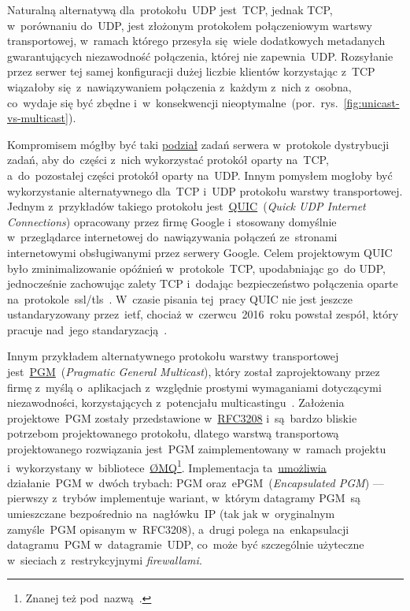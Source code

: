 \documentclass[thesis]{subfiles}
\begin{document}
Naturalną alternatywą dla~protokołu~UDP jest~TCP, jednak TCP, w~porównaniu do~UDP, jest złożonym protokołem połączeniowym wartswy transportowej, w~ramach którego przesyła się~wiele dodatkowych metadanych gwarantujących niezawodność połączenia, której nie zapewnia~UDP. Rozsyłanie przez serwer tej samej konfiguracji dużej liczbie klientów korzystając z~TCP wiązałoby się~z~nawiązywaniem połączenia z~każdym z~nich z~osobna, co~wydaje się być zbędne i~w~konsekwencji nieoptymalne~(por.~rys.~\ref{fig:unicast-vs-multicast}).

Kompromisem mógłby być taki \hyperlink{server-role}{podział} zadań serwera w~protokole dystrybucji zadań, aby do~części z~nich wykorzystać protokół oparty na~TCP, a~do~pozostałej części protokół oparty na~UDP. Innym pomysłem mogłoby być wykorzystanie alternatywnego dla~TCP i~UDP protokołu warstwy transportowej. Jednym z~przykładów takiego protokołu jest~\href{https://en.wikipedia.org/wiki/QUIC}{QUIC}~(\emph{Quick UDP Internet Connections}) opracowany przez firmę Google i~stosowany domyślnie w~przeglądarce internetowej  do~nawiązywania połączeń ze~stronami internetowymi obsługiwanymi przez serwery Google. Celem projektowym QUIC było zminimalizowanie opóźnień w~protokole~TCP, upodabniając go~do UDP, jednocześnie zachowując zalety TCP i~dodając bezpieczeństwo połączenia oparte na~protokole~\gls{ssl/tls}~\cite{quic-wire-layout-spec,quic-crypto,quic-roskind}. W~czasie pisania tej~pracy QUIC nie jest jeszcze ustandaryzowany przez~\gls{ietf}, chociaż w~czerwcu~2016~roku powstał zespół, który pracuje nad~jego standaryzacją~\cite{quic-draft,quic-workinggroup}.

Innym przykładem alternatywnego protokołu warstwy transportowej jest~\href{https://en.wikipedia.org/wiki/Pragmatic_General_Multicast}{PGM}~(\emph{Pragmatic General Multicast}), który został zaprojektowany przez firmę  z~myślą o~aplikacjach z~względnie prostymi wymaganiami dotyczącymi niezawodności, korzystających z~potencjału multicastingu~\cite{pgm-rfc}. Założenia projektowe~PGM zostały przedstawione w~\href{https://tools.ietf.org/html/rfc3208}{RFC3208} i~są~bardzo bliskie potrzebom projektowanego protokołu, dlatego warstwą transportową projektowanego rozwiązania jest~PGM zaimplementowany w~ramach projektu  i~wykorzystany w~bibliotece~\href{http://zeromq.org/}{ØMQ}\footnote{Znanej też pod~nazwą~.}. Implementacja ta~\href{http://api.zeromq.org/2-1:zmq-pgm}{umożliwia} działanie~PGM w~dwóch trybach: PGM oraz~ePGM~(\emph{Encapsulated PGM}) --- pierwszy z~trybów implementuje wariant, w~którym datagramy PGM~są umieszczane bezpośrednio na~nagłówku~IP (tak jak w~oryginalnym zamyśle~PGM opisanym w~RFC3208), a~drugi polega na~enkapsulacji datagramu~PGM w~datagramie~UDP, co~może być szczególnie użyteczne w~sieciach z~restrykcyjnymi \emph{firewallami}. %
\end{document}
